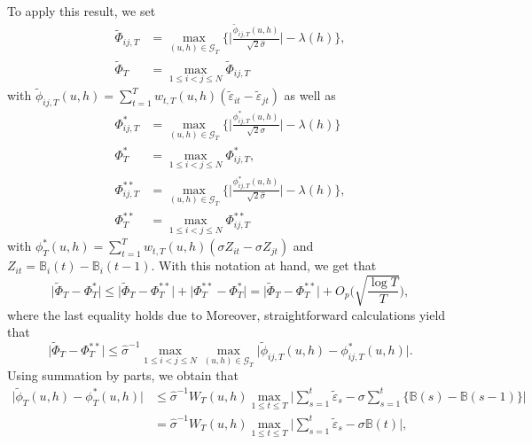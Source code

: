\documentclass[a4paper,12pt]{article}
\numberwithin{equation}{section}
\begin{document}
To apply this result, we set
\begin{align*}
\widetilde{\Phi}_{ij,T} & = \max_{(u,h) \in \mathcal{G}_T} \Big\{ \Big|\frac{\widetilde{\phi}_{ij,T}(u,h)}{\sqrt{2}\widehat{\sigma}}\Big| - \lambda(h) \Big\},\\
\widetilde{\Phi}_T & = \max_{1\le i < j \le N} \widetilde{\Phi}_{ij,T}
\end{align*}
with $\widetilde{\phi}_{ij,T}(u,h) = \sum\nolimits_{t=1}^T w_{t,T}(u,h) (\widetilde{\varepsilon}_{it} - \widetilde{\varepsilon}_{jt})$ as well as 
\begin{align*}
\Phi_{ij,T}^* & = \max_{(u,h) \in \mathcal{G}_T} \Big\{ \Big|\frac{\phi_{ij,T}^*(u,h)}{\sqrt{2}\sigma}\Big| - \lambda(h) \Big\} \\
\Phi_T^* &= \max_{1\le i < j \le N} \Phi^*_{ij,T},\\
\Phi_{ij,T}^{**} & = \max_{(u,h) \in \mathcal{G}_T} \Big\{ \Big|\frac{\phi_{ij,T}^*(u,h)}{\sqrt{2}\widehat{\sigma}}\Big| - \lambda(h) \Big\},\\
\Phi_T^{**} &= \max_{1\le i < j \le N} \Phi^{**}_{ij,T}
\end{align*}
with $\phi_T^*(u,h) = \sum\nolimits_{t=1}^T w_{t,T}(u,h) (\sigma Z_{it} - \sigma Z_{jt})$ and $Z_{it} = \mathbb{B}_i(t) - \mathbb{B}_i(t-1)$. With this notation at hand, we get that 
\begin{equation}\label{eq-strongapprox-equality-bound1}
\big| \widetilde{\Phi}_T - \Phi_T^* \big| \le \big| \widetilde{\Phi}_T - \Phi_T^{**} \big| + \big| \Phi_T^{**} - \Phi_T^{*} \big| = \big| \widetilde{\Phi}_T - \Phi_T^{**} \big| + O_p \Big( \sqrt{\frac{\log T}{T}} \Big), 
\end{equation}
where the last equality holds due to 
Moreover, straightforward calculations yield that 
\[ \big| \widetilde{\Phi}_T - \Phi_T^{**} \big| \le \widehat{\sigma}^{-1} \max_{1\le i<j \le N} \max_{(u,h) \in \mathcal{G}_T} \big| \widetilde{\phi}_{ij,T}(u,h) - \phi_{ij,T}^*(u,h) \big|. \]
Using summation by parts,
we obtain that 
\begin{align*}
\big| \widetilde{\phi}_T(u,h) - \phi_T^*(u,h) \big| 
 & \le \widehat{\sigma}^{-1} W_T(u,h) \max_{1 \le t \le T} \Big| \sum\limits_{s=1}^t \widetilde{\varepsilon}_s - \sigma \sum\limits_{s=1}^t \big\{ \mathbb{B}(s) - \mathbb{B}(s-1) \big\} \Big| \\
 & = \widehat{\sigma}^{-1} W_T(u,h) \max_{1 \le t \le T} \Big| \sum\limits_{s=1}^t \widetilde{\varepsilon}_s - \sigma \mathbb{B}(t) \Big|,
\end{align*}
\end{document}
